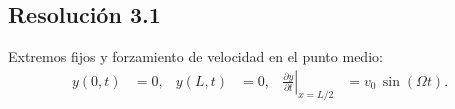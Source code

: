 \documentclass[
  11pt,
  letterpaper,
   addpoints,
   answers
  ]{exam}
\begin{document}
\begin{questions}
\begin{solution}
\subsection*{Resolución 3.1}
Extremos fijos y forzamiento de velocidad en el punto medio:
\begin{align}
  y(0,t) &= 0, &
  y(L,t) &= 0, &
  \left.\frac{\partial y}{\partial t}\right|_{x=L/2} &= v_0\,\sin(\Omega t).
\end{align}


\end{solution}
\end{questions}
\end{document}
